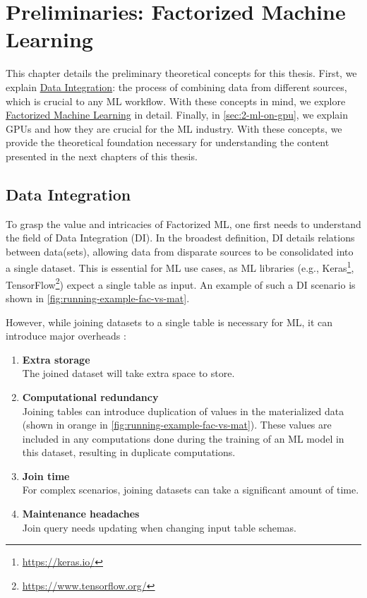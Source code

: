 
\chapter{Preliminaries: Factorized Machine Learning}
\label{chapter:preliminary}

This chapter details the preliminary theoretical concepts for this thesis. First, we explain \hyperref[sec:2-data-integration]{Data Integration}: the process of combining data from different sources, which is crucial to any ML workflow. With these concepts in mind, we explore \hyperref[sec:2-factorized-ml]{Factorized Machine Learning} in detail. Finally, in \autoref{sec:2-ml-on-gpu}, we explain GPUs and how they are crucial for the ML industry. With these concepts, we provide the theoretical foundation necessary for understanding the content presented in the next chapters of this thesis.


\section{Data Integration}
\label{sec:2-data-integration}
To grasp the value and intricacies of Factorized ML, one first needs to understand the field of Data Integration (DI). In the broadest definition, DI details relations between data(sets), allowing data from disparate sources to be consolidated into a single dataset. This is essential for ML use cases, as ML libraries (e.g., Keras\footnote{\url{https://keras.io/}}, TensorFlow\footnote{\url{https://www.tensorflow.org/}}) expect a single table as input. An example of such a DI scenario is shown in \autoref{fig:running-example-fac-vs-mat}.


However, while joining datasets to a single table is necessary for ML, it can introduce major overheads \cite{data-management-in-ML-kumar-2017}:

\begin{enumerate}
    \item \textbf{Extra storage}\\ The joined dataset will take extra space to store.
    \item \textbf{Computational redundancy} \\ Joining tables can introduce duplication of values in the materialized data (shown in orange in \autoref{fig:running-example-fac-vs-mat}). These values are included in any computations done during the training of an ML model in this dataset, resulting in duplicate computations.
    \item \textbf{Join time} \\For complex scenarios, joining datasets can take a significant amount of time.
    \item \textbf{Maintenance headaches} \\Join query needs updating when changing input table schemas.
\end{enumerate}


